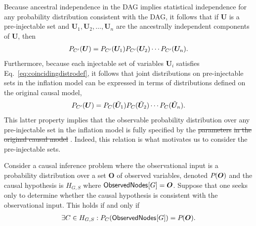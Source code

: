 Because ancestral independence in the DAG implies statistical independence for any probability distribution consistent with the DAG, it follows that  if 
$\bm{U}$ is a pre-injectable set and $\bm{U}_1,\bm{U}_2,\ldots,\bm{U}_n$ are the ancestrally independent components of $\bm{U}$, then 
\begin{align}%
\pdf[C']{\bm{U}} = \pdf[C']{\bm{U}_1} \pdf[C']{\bm{U}_2}  \cdots \pdf[C']{\bm{U}_n}.
\end{align}
Furthermore, because each injectable set of variables $\bm{U}_i$ satisfies Eq.~\eqref{eq:coincidingdistrodef}, it follows that joint distributions on pre-injectable sets in the inflation model can be expressed in terms of distributions defined on the original causal model,
\begin{align}\label{eq:preinjfactor}
\pdf[C']{\bm{U}} = \pdf[C]{\subsim{\bm{U}}_1} \pdf[C]{\subsim{\bm{U}}_2}  \cdots \pdf[C]{\subsim{\bm{U}}_n}.
\end{align}
This latter property implies that the observable probability distribution over any pre-injectable set in the inflation model is fully specified by the \sout{parameters}  \sout{in the original causal model} .  Indeed, this relation is what motivates us to consider the pre-injectable sets.

Consider a causal inference problem where the observational input is a probability distribution over a set $\bm{O}$ of observed variables, denoted $\pdf{\bm{O}}$ and the causal hypothesis is $H_{G,S}$ where $\SmallNamedFunction{ObservedNodes}{G}=\bm{O}$.  Suppose that one seeks only to determine whether the causal hypothesis is consistent with the observational input.  
This holds if and only if
\begin{align}
\exists C \in H_{G,S} : \pdf[C]{\SmallNamedFunction{ObservedNodes}{G}}= \pdf{\bm{O}}.
\end{align}




